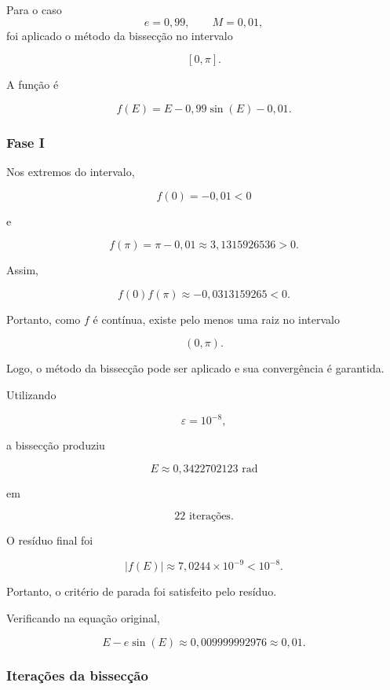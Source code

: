 \documentclass[
	12pt,				%
	openright,			%
	a4paper,			%
	english,			%
	french,				%
	spanish,			%
	brazil,				%
	]{abntex2}
\begin{document}
Para o caso
\[
e=0,99,
\qquad
M=0,01,
\]
foi aplicado o método da bissecção no intervalo

\[
[0,\pi].
\]

A função é

\[
f(E)=E-0,99\sin(E)-0,01.
\]

\subsubsection*{Fase I}

Nos extremos do intervalo,

\[
f(0)=-0,01<0
\]

e

\[
f(\pi)
=
\pi-0,01
\approx
3,1315926536>0.
\]

Assim,

\[
f(0)f(\pi)
\approx
-0,0313159265<0.
\]

Portanto, como $f$ é contínua, existe pelo menos uma raiz no intervalo

\[
\boxed{(0,\pi)}.
\]

Logo, o método da bissecção pode ser aplicado e sua convergência é garantida.

Utilizando

\[
\varepsilon=10^{-8},
\]

a bissecção produziu

\[
\boxed{E\approx0,3422702123\text{ rad}}
\]

em

\[
\boxed{22\text{ iterações}}.
\]

O resíduo final foi

\[
|f(E)|
\approx
7,0244\times10^{-9}
<
10^{-8}.
\]

Portanto, o critério de parada foi satisfeito pelo resíduo.

Verificando na equação original,

\[
E-e\sin(E)
\approx
0,009999992976
\approx
0,01.
\]

\subsubsection*{Iterações da bissecção}
\end{document}
